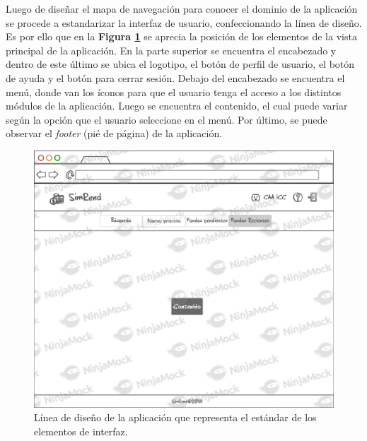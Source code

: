 Luego de diseñar el mapa de navegación para conocer el dominio de la aplicación se procede a estandarizar la interfaz de usuario, confeccionando la línea de diseño. Es por ello que en la \textbf{Figura \ref{fig: Linea_disenio}} se aprecia la posición de los elementos de la vista principal de la aplicación. En la parte superior se encuentra el encabezado y dentro de este último se ubica el logotipo, el botón de perfil de usuario, el botón de ayuda y el botón para cerrar sesión. Debajo del encabezado se encuentra el menú, donde van los íconos para que el usuario tenga el acceso a los distintos módulos de la aplicación. Luego se encuentra el contenido, el cual puede variar según la opción que el usuario seleccione en el menú. Por último, se puede observar el \emph{footer} (pié de página) de la aplicación.

\begin{figure}[h!tb]
    \includegraphics[width=\textwidth]{Imagenes/Linea_de_disenio.png}
    \caption{\label{fig: Linea_disenio}Línea de diseño de la aplicación que representa el estándar de los elementos de interfaz.}
\end{figure}